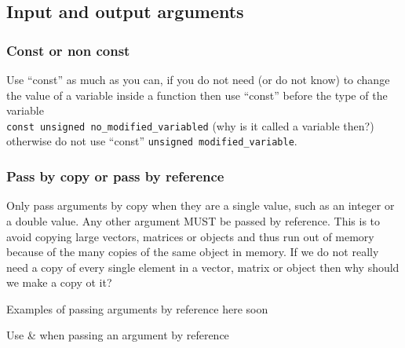 \documentclass[12pt,a4paper,final]{report} %
\begin{document}
\subsection{Input and output arguments}

\subsubsection{Const or non const}
Use ``const'' as much as you can, if you do not need (or do not know)
to change the value of a variable inside a function then use ``const''
before the type of the variable\\

\texttt{const unsigned no\_modified\_variabled} (why is it called a
variable then?)
\\
otherwise do not use ``const'' \texttt{unsigned modified\_variable}.


\subsubsection{Pass by copy or pass by reference}
Only pass arguments by copy when they are a single value, such as an
integer or a double value. Any other argument MUST be passed by
reference. This is to avoid copying large vectors, matrices or objects
and thus run out of memory because of the many copies of the same
object in memory. If we do not really need a copy of every single
element in a vector, matrix or object then why should we make a copy
ot it?

Examples of passing arguments by reference here soon

Use \& when passing an argument by reference

\printbibliography[heading=bibintoc]
\end{document}
